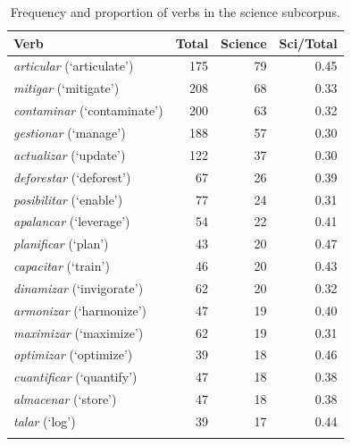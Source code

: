 \documentclass[pdflatex,sn-mathphys-num, iicol]{sn-jnl}
\begin{document}
	\begin{table}[h!]
		\caption{Frequency and proportion of verbs in the science subcorpus.}
		\label{tab:verbos_ciencia}
		\footnotesize
		\begin{tabular}{@{}lrrr@{}}
			\toprule
			\textbf{Verb} & \textbf{Total} & \textbf{Science} & \textbf{Sci/Total} \\
			\midrule
			\textit{articular} (`articulate')   & 175 & 79 & 0.45 \\
			\textit{mitigar} (`mitigate')       & 208 & 68 & 0.33 \\
			\textit{contaminar} (`contaminate') & 200 & 63 & 0.32 \\
			\textit{gestionar} (`manage')       & 188 & 57 & 0.30 \\
			\textit{actualizar} (`update')      & 122 & 37 & 0.30 \\
			\textit{deforestar} (`deforest')    & 67  & 26 & 0.39 \\
			\textit{posibilitar} (`enable')     & 77  & 24 & 0.31 \\
			\textit{apalancar} (`leverage')     & 54  & 22 & 0.41 \\
			\textit{planificar} (`plan')        & 43  & 20 & 0.47 \\
			\textit{capacitar} (`train')        & 46  & 20 & 0.43 \\
			\textit{dinamizar} (`invigorate')   & 62  & 20 & 0.32 \\
			\textit{armonizar} (`harmonize')    & 47  & 19 & 0.40 \\
			\textit{maximizar} (`maximize')     & 62  & 19 & 0.31 \\
			\textit{optimizar} (`optimize')     & 39  & 18 & 0.46 \\
			\textit{cuantificar} (`quantify')   & 47  & 18 & 0.38 \\
			\textit{almacenar} (`store')        & 47  & 18 & 0.38 \\
			\textit{talar} (`log')              & 39  & 17 & 0.44 \\
			\botrule
		\end{tabular}
	\end{table}
	
\end{document}
